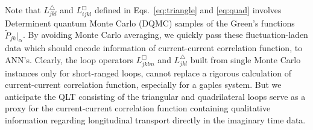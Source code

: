 \documentclass[amsmath,amssymb, aps, prl, twocolumn]{revtex4-1}
\begin{document}
Note that  $L^\triangle_{jkl}$ and  $L^\Box_{ijkl}$ defined in Eqs.~\ref{eq:triangle} and \ref{eq:quad} involves  Determinent quantum Monte Carlo (DQMC) samples of the Green's functions $\widetilde{P}_{jk}|_{\alpha}$. By avoiding Monte Carlo averaging, we quickly pass these fluctuation-laden data which should encode information of current-current correlation function,  to ANN's. 
Clearly, the loop operators $L^\Box_{jklm}$ and $ L^\triangle_{jkl}$ built from single Monte Carlo instances only for short-ranged loops, cannot replace a rigorous calculation of current-current correlation function, especially for a gaples system. But we anticipate the QLT consisting of the triangular and quadrilateral loops serve as a proxy for the current-current correlation function containing qualitative information regarding longitudinal transport directly in the imaginary time data.  



\end{document}
